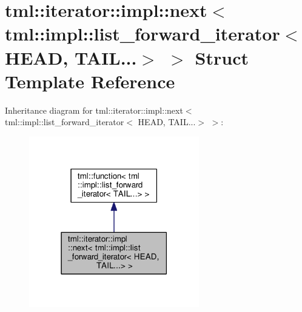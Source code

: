 \hypertarget{structtml_1_1iterator_1_1impl_1_1next_3_01tml_1_1impl_1_1list__forward__iterator_3_01_h_e_a_d_00_01_t_a_i_l_8_8_8_4_01_4}{\section{tml\+:\+:iterator\+:\+:impl\+:\+:next$<$ tml\+:\+:impl\+:\+:list\+\_\+forward\+\_\+iterator$<$ H\+E\+A\+D, T\+A\+I\+L...$>$ $>$ Struct Template Reference}
\label{structtml_1_1iterator_1_1impl_1_1next_3_01tml_1_1impl_1_1list__forward__iterator_3_01_h_e_a_d_00_01_t_a_i_l_8_8_8_4_01_4}
}


Inheritance diagram for tml\+:\+:iterator\+:\+:impl\+:\+:next$<$ tml\+:\+:impl\+:\+:list\+\_\+forward\+\_\+iterator$<$ H\+E\+A\+D, T\+A\+I\+L...$>$ $>$\+:
\nopagebreak
\begin{figure}[H]
\begin{center}
\leavevmode
\includegraphics[width=210pt]{structtml_1_1iterator_1_1impl_1_1next_3_01tml_1_1impl_1_1list__forward__iterator_3_01_h_e_a_d_0090ed99328cc34a638319fa99f60dfc74}
\end{center}
\end{figure}


